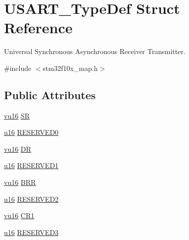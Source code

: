 \hypertarget{struct_u_s_a_r_t___type_def}{}\section{U\+S\+A\+R\+T\+\_\+\+Type\+Def Struct Reference}
\label{struct_u_s_a_r_t___type_def}


Universal Synchronous Asynchronous Receiver Transmitter.  




{\ttfamily \#include $<$stm32f10x\+\_\+map.\+h$>$}

\subsection*{Public Attributes}
\begin{DoxyCompactItemize}
\item 
\hyperlink{agilefox_2library_2inc_2stm32f10x__type_8h_a9e9f2c67df0bbcd2dd7753693525ee07}{vu16} \hyperlink{struct_u_s_a_r_t___type_def_a5619801ce2b9866763e17ce3f405597b}{SR}
\item 
\hyperlink{agilefox_2library_2inc_2stm32f10x__type_8h_a9e6c91d77e24643b888dbd1a1a590054}{u16} \hyperlink{struct_u_s_a_r_t___type_def_a2c8f2f7adfbbbeb6a645cca18d9e9e02}{R\+E\+S\+E\+R\+V\+E\+D0}
\item 
\hyperlink{agilefox_2library_2inc_2stm32f10x__type_8h_a9e9f2c67df0bbcd2dd7753693525ee07}{vu16} \hyperlink{struct_u_s_a_r_t___type_def_a0211523095685c0b4f91bf7e1e6e0984}{DR}
\item 
\hyperlink{agilefox_2library_2inc_2stm32f10x__type_8h_a9e6c91d77e24643b888dbd1a1a590054}{u16} \hyperlink{struct_u_s_a_r_t___type_def_af8bdc4963e3c4bd45b03fe0ae4293d01}{R\+E\+S\+E\+R\+V\+E\+D1}
\item 
\hyperlink{agilefox_2library_2inc_2stm32f10x__type_8h_a9e9f2c67df0bbcd2dd7753693525ee07}{vu16} \hyperlink{struct_u_s_a_r_t___type_def_aaef1456e1f34619538a82e7847f0ed4a}{B\+RR}
\item 
\hyperlink{agilefox_2library_2inc_2stm32f10x__type_8h_a9e6c91d77e24643b888dbd1a1a590054}{u16} \hyperlink{struct_u_s_a_r_t___type_def_ad340bfc51f598cbb05370232ab18bcd2}{R\+E\+S\+E\+R\+V\+E\+D2}
\item 
\hyperlink{agilefox_2library_2inc_2stm32f10x__type_8h_a9e9f2c67df0bbcd2dd7753693525ee07}{vu16} \hyperlink{struct_u_s_a_r_t___type_def_add7776b5be090fa5412ba86489349737}{C\+R1}
\item 
\hyperlink{agilefox_2library_2inc_2stm32f10x__type_8h_a9e6c91d77e24643b888dbd1a1a590054}{u16} \hyperlink{struct_u_s_a_r_t___type_def_a816253638535f34b0f3b759084ecec5e}{R\+E\+S\+E\+R\+V\+E\+D3}

\end{DoxyCompactItemize}
